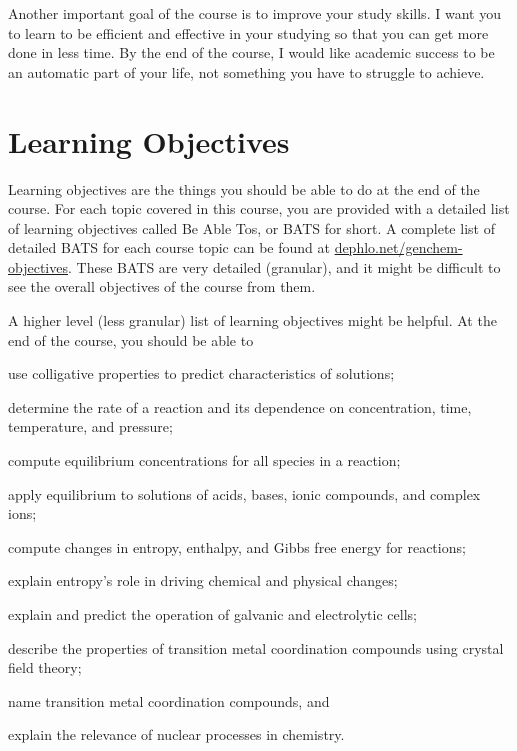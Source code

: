 \documentclass[letterpaper,oneside,onecolumn,11pt,article]{memoir}
\begin{document}
Another important goal of the course is to improve your study skills. I want you to learn to be efficient and effective in your studying so that you can get more done in less time. By the end of the course, I would like academic success to be an automatic part of your life, not something you have to struggle to achieve. 
%
%
\section{Learning Objectives}
Learning objectives are the things you should be able to do at the end of the course. For each topic covered in this course, you are provided with a detailed list of learning objectives called Be Able Tos, or BATS for short. A complete list of detailed BATS for each course topic can be found at \href{http://dephlo.net/chem110/lecture/objectives}{dephlo.net/genchem-objectives}. These BATS are very detailed (granular), and it might be difficult to see the overall objectives of the course from them. 

A higher level (less granular) list of learning objectives might be helpful. At the end of the course, you should be able to 
\begin{inparaenum}
\item use colligative properties to predict characteristics of solutions;
\item determine the rate of a reaction and its dependence on concentration, time, temperature, and pressure;
\item compute equilibrium concentrations for all species in a reaction;
\item apply equilibrium to solutions of acids, bases, ionic compounds, and complex ions;
\item compute changes in entropy, enthalpy, and Gibbs free energy for reactions;
\item explain entropy's role in driving chemical and physical changes;
\item explain and predict the operation of galvanic and electrolytic cells;
\item describe the properties of transition metal coordination compounds using crystal field theory;
\item name transition metal coordination compounds, and
\item explain the relevance of nuclear processes in chemistry.
\end{inparaenum}
\end{document}
